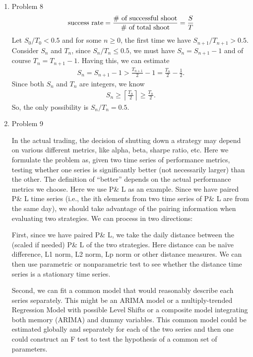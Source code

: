 \documentclass[10pt, onecolumn, draftcls]{IEEEtran}
\begin{document}
\begin{enumerate}
\item Problem 8
\begin{align*}
\textup{success rate} = \frac{\textup{\# of successful shoot}}{\textup{\# of total shoot}} = \frac{S}{T}
\end{align*}
Let $S_0/T_0 < 0.5$ and for some $n\geq 0$, the first time we have $S_{n+1}/T_{n+1} > 0.5$. Consider $S_n$ and $T_n$, since $S_n/T_n \leq 0.5$, we must have $S_n = S_{n+1}-1$ and of course $T_n = T_{n+1} - 1$. Having this, we can estimate
\begin{align*}
S_n = S_{n+1} - 1 > \frac{T_{n+1}}{2} - 1 = \frac{T_n}{2} - \frac{1}{2}.
\end{align*}
Since both $S_n$ and $T_n$ are integers, we know
\begin{align*}
S_n \geq \left\lceil \frac{T_n}{2} \right\rceil\geq \frac{T_n}{2}.
\end{align*}
So, the only possibility is $S_n/T_n = 0.5$.

\item Problem 9

In the actual trading, the decision of shutting down a strategy may depend on various different metrics, like alpha, beta, sharpe ratio, etc. Here we formulate the problem as, given two time series of performance metrics, testing whether one series is significantly better (not necessarily larger) than the other. The definition of ``better'' depends on the actual performance metrics we choose. Here we use P\& L as an example. Since we have paired P\& L time series (i.e., the ith elements from two time series of P\& L are from the same day), we should take advantage of the pairing information when evaluating two strategies. We can process in two directions:

First, since we have paired P\& L, we take the daily distance between the (scaled if needed) P\& L of the two strategies. Here distance can be naïve difference, L1 norm, L2 norm, Lp norm or other distance measures. We can then use parametric or nonparametric test to see whether the distance time series is a stationary time series.

Second, we can fit a common model that would reasonably describe each series separately. This might be an ARIMA model or a multiply-trended Regression Model with possible Level Shifts or a composite model integrating both memory (ARIMA) and dummy variables. This common model could be estimated globally and separately for each of the two series and then one could construct an F test to test the hypothesis of a common set of parameters.


\end{enumerate}
\end{document}
